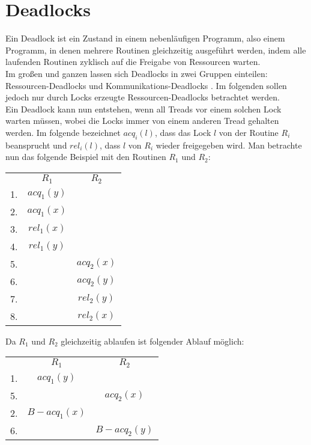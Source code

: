 \section{Deadlocks} \label{Kap::Theo:Deadlocks}
Ein Deadlock ist ein Zustand in einem nebenläufigen Programm, also einem 
Programm, in denen mehrere Routinen gleichzeitig ausgeführt werden, indem alle 
laufenden Routinen zyklisch auf die Freigabe von Ressourcen warten.\\
Im großen und ganzen lassen sich Deadlocks in zwei Gruppen einteilen: 
Ressourcen-Deadlocks und Kommunikations-Deadlocks \cite{zhou}.
Im folgenden sollen jedoch nur durch Locks erzeugte Ressourcen-Deadlocks 
betrachtet werden.\\
Ein Deadlock kann nun entstehen, wenn all Treads vor einem solchen Lock warten 
müssen, wobei die Locks immer von einem anderen Tread gehalten werden. 
Im folgende bezeichnet $acq_i(l)$, dass das Lock $l$ von der Routine $R_i$ 
beansprucht und $rel_i(l)$, dass $l$ von $R_i$ wieder freigegeben wird. 
Man betrachte nun das folgende Beispiel \cite{sulzmann} mit den Routinen 
$R_1$ und $R_2$:
\begin{table}[H]
    \centering
    \begin{tabular}{ccc}
       & $R_1$        & $R_2$          \\
    1. & $acq_{1}(y)$ &                \\
    2. & $acq_{1}(x)$ &                \\
    3. & $rel_{1}(x)$ &                \\
    4. & $rel_{1}(y)$ &                \\
    5. &              & $acq_{2}(x)$ \\
    6. &              & $acq_{2}(y)$ \\
    7. &              & $rel_{2}(y)$ \\
    8. &              & $rel_{2}(x)$
    \end{tabular}
\end{table}
Da $R_1$ und $R_2$ gleichzeitig ablaufen ist folgender Ablauf möglich:
\begin{table}[H]
    \centering
    \begin{tabular}{ccc}
       & $R_1$          & $R_2$          \\
    1. & $acq_{1}(y)$ &                \\
    5. &                & $acq_{2}(x)$ \\
    2. & $B-acq_{1}(x)$ &                \\
    6. &                & $B-acq_{2}(y)$
    \end{tabular}
\end{table}
